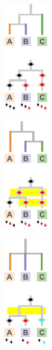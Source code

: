 \begin{figure}
  \centering
\centering
\begin{minipage}{0.5\textwidth}

\begin{minipage}{0.33\linewidth}
\centering
\includegraphics[height=2.2in]{img/hstrat-failure-modes-correct}
\label{fig:hstrat-failure-modes:correct}
\end{minipage}%
\vrule
\centering
\begin{minipage}{0.33\linewidth}
\centering
\includegraphics[height=2.2in]{img/hstrat-failure-modes-incorrect}
\label{fig:hstrat-failure-modes:incorrect}
\end{minipage}%
\vrule
\begin{minipage}{0.3\linewidth}
\centering
\vspace{-0.4ex}%
\includegraphics[height=2.205in]{img/hstrat-failure-modes-unresolved}%

\end{minipage}
\end{minipage}
\end{figure}

